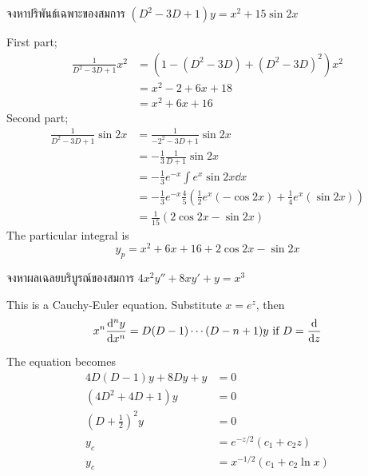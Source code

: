 \documentclass[12pt,final]{novelette} %
\begin{document}
\begin{question}[resume]
    \item {}
    จงหาปริพันธ์เฉพาะของสมการ $(D^2 - 3D + 1)y = x^2 + 15 \sin 2x$ 

    \bigskip
    First part;
    \begin{align*}
        \frac{1}{D^2-3D+1}x^2 & = (1 - (D^2 - 3D) + (D^2 - 3D)^2) x^2 \\
                              & = x^2 - 2 + 6x + 18                   \\
                              & = x^2 + 6x + 16
    \end{align*}
    Second part;
    \begin{align*}
        \frac{1}{D^2-3D+1}\sin2x & = \frac{1}{-2^2-3D+1}\sin 2x                                                          \\
                                 & = -\frac13 \frac{1}{D+1}\sin 2x                                                       \\
                                 & = -\frac13 e^{-x} \int e^x \sin 2x \dd{x}                                             \\
                                 & = -\frac13 e^{-x} \frac45 \left(\frac12 e^x (-\cos 2x) + \frac14 e^x (\sin 2x)\right) \\
                                 & = \frac{1}{15} (2 \cos 2x - \sin 2x)
    \end{align*}
    The particular integral is
    $$
        \boxed{y_p = x^2 + 6x + 16 + 2 \cos 2x - \sin 2x}
    $$

    \item {}
    จงหาผลเฉลยบริบูรณ์ของสมการ $4x^2y'' + 8xy' + y = x^3$ 

    \bigskip
    This is a Cauchy-Euler equation.
    Substitute $x = e^z$, then
    $$ x^n \dv[n]{y}{x} = D(D-1)\cdots(D-n+1)y \ \text{if}\  D = \dv{z} $$

    The equation becomes
    \begin{align*}
        4 D(D-1)y + 8Dy + y          & = 0                          \\
        (4D^2 + 4D + 1) y            & = 0                          \\
        \left(D + \frac12\right)^2 y & = 0                          \\
        y_c                          & = e^{-z/2} (c_1 + c_2 z)     \\
        y_c                          & = x^{-1/2} (c_1 + c_2 \ln x)
    \end{align*}


\end{question}
\end{document}
